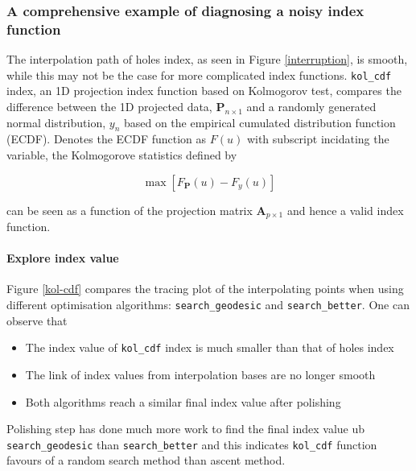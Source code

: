 \documentclass[12pt]{article}
\providecommand{\tightlist}{%
  \setlength{\itemsep}{0pt}\setlength{\parskip}{0pt}}
\begin{document}
\newpage

\hypertarget{a-comprehensive-example-of-diagnosing-a-noisy-index-function}{%
\subsubsection{A comprehensive example of diagnosing a noisy index
function}\label{a-comprehensive-example-of-diagnosing-a-noisy-index-function}}

The interpolation path of holes index, as seen in Figure
\ref{interruption}, is smooth, while this may not be the case for more
complicated index functions. \texttt{kol\_cdf} index, an 1D projection
index function based on Kolmogorov test, compares the difference between
the 1D projected data, \(\mathbf{P}_{n \times 1}\) and a randomly
generated normal distribution, \(y_n\) based on the empirical cumulated
distribution function (ECDF). Denotes the ECDF function as \(F(u)\) with
subscript incidating the variable, the Kolmogorove statistics defined by

\[\max \left[F_{\mathbf{P}}(u) - F_{y}(u)\right]\]

can be seen as a function of the projection matrix
\(\mathbf{A}_{p \times 1}\) and hence a valid index function.

\hypertarget{explore-index-value}{%
\paragraph{Explore index value}\label{explore-index-value}}

Figure \ref{kol-cdf} compares the tracing plot of the interpolating
points when using different optimisation algorithms:
\texttt{search\_geodesic} and \texttt{search\_better}. One can observe
that

\begin{itemize}
\tightlist
\item
  The index value of \texttt{kol\_cdf} index is much smaller than that
  of holes index
\item
  The link of index values from interpolation bases are no longer smooth
\item
  Both algorithms reach a similar final index value after polishing
\end{itemize}

Polishing step has done much more work to find the final index value ub
\texttt{search\_geodesic} than \texttt{search\_better} and this
indicates \texttt{kol\_cdf} function favours of a random search method
than ascent method.
\end{document}
